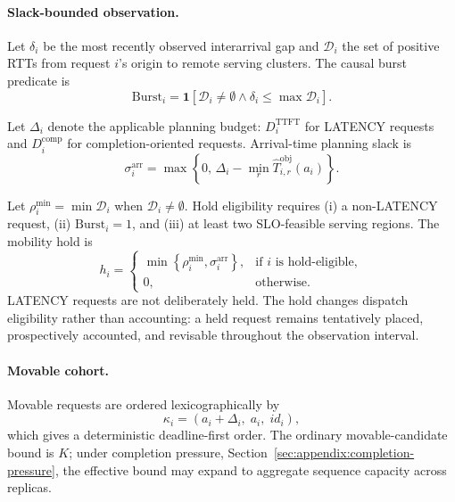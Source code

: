 \documentclass[letterpaper,twocolumn,10pt]{article}
\begin{document}
\paragraph{Slack-bounded observation.}
Let $\delta_i$ be the most recently observed interarrival gap and
$\mathcal{D}_i$ the set of positive RTTs from request $i$'s origin to remote
serving clusters.
The causal burst predicate is
\begin{equation}
    \mathrm{Burst}_i
    =
    \mathbf{1}\!\left[
        \mathcal{D}_i\neq\emptyset
        \land
        \delta_i\le\max\mathcal{D}_i
    \right].
    \label{eq:appendix:burst-predicate}
\end{equation}

Let $\Delta_i$ denote the applicable planning budget:
$D_i^{\mathrm{TTFT}}$ for LATENCY requests and
$D_i^{\mathrm{comp}}$ for completion-oriented requests.
Arrival-time planning slack is
\begin{equation}
    \sigma_i^{\mathrm{arr}}
    =
    \max\!\left\{
        0,\,
        \Delta_i-\min_r
        \widehat{T}^{\mathrm{obj}}_{i,r}(a_i)
    \right\}.
    \label{eq:appendix:arrival-slack}
\end{equation}

Let $\rho_i^{\min}=\min\mathcal{D}_i$ when
$\mathcal{D}_i\neq\emptyset$.
Hold eligibility requires
(i) a non-LATENCY request,
(ii) $\mathrm{Burst}_i=1$, and
(iii) at least two SLO-feasible serving regions.
The mobility hold is
\begin{equation}
    h_i
    =
    \begin{cases}
        \min\!\left\{
            \rho_i^{\min},
            \sigma_i^{\mathrm{arr}}
        \right\},
        & \text{if $i$ is hold-eligible},\\
        0,
        & \text{otherwise}.
    \end{cases}
    \label{eq:appendix:mobility-hold}
\end{equation}
LATENCY requests are not deliberately held.
The hold changes dispatch eligibility rather than accounting: a held request
remains tentatively placed, prospectively accounted, and revisable throughout
the observation interval.

\paragraph{Movable cohort.}
Movable requests are ordered lexicographically by
\begin{equation}
    \kappa_i
    =
    \left(
        a_i+\Delta_i,\;
        a_i,\;
        id_i
    \right),
    \label{eq:appendix:planning-order}
\end{equation}
which gives a deterministic deadline-first order.
The ordinary movable-candidate bound is $K$; under completion pressure,
Section~\ref{sec:appendix:completion-pressure}, the effective bound may expand
to aggregate sequence capacity across replicas.
\end{document}

